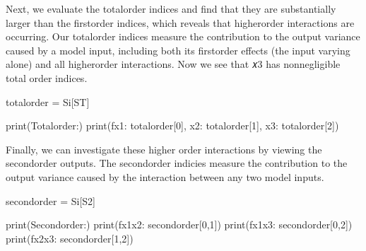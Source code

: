 \documentclass[letterpaper,10pt,english]{book}
\begin{document}
\begin{sphinxVerbatim}[commandchars=\\\{\}]
     
\end{sphinxVerbatim}

\sphinxAtStartPar
Next, we evaluate the total\sphinxhyphen{}order indices and find that they are
substantially larger than the first\sphinxhyphen{}order indices, which reveals that
higher\sphinxhyphen{}order interactions are occurring. Our total\sphinxhyphen{}order indices measure
the contribution to the output variance caused by a model input,
including both its first\sphinxhyphen{}order effects (the input varying alone) and all
higher\sphinxhyphen{}order interactions. Now we see that 𝑥3 has non\sphinxhyphen{}negligible total
order indices.

\begin{sphinxVerbatim}[commandchars=\\\{\}]
total\PYGZus{}order = Si[\PYGZsq{}ST\PYGZsq{}]

print(\PYGZsq{}Total\PYGZhy{}order:\PYGZsq{})
print(f\PYGZdq{}x1: \PYGZob{}total\PYGZus{}order[0]\PYGZcb{}, x2: \PYGZob{}total\PYGZus{}order[1]\PYGZcb{}, x3: \PYGZob{}total\PYGZus{}order[2]\PYGZcb{}\PYGZdq{})
\end{sphinxVerbatim}

\begin{sphinxVerbatim}[commandchars=\\\{\}]
     
\end{sphinxVerbatim}

\sphinxAtStartPar
Finally, we can investigate these higher order interactions by viewing
the second\sphinxhyphen{}order outputs. The second\sphinxhyphen{}order indicies measure the
contribution to the output variance caused by the interaction between
any two model inputs.

\begin{sphinxVerbatim}[commandchars=\\\{\}]
second\PYGZus{}order = Si[\PYGZsq{}S2\PYGZsq{}]

print(\PYGZdq{}Second\PYGZhy{}order:\PYGZdq{})
print(f\PYGZdq{}x1\PYGZhy{}x2:  \PYGZob{}second\PYGZus{}order[0,1]\PYGZcb{}\PYGZdq{})
print(f\PYGZdq{}x1\PYGZhy{}x3:  \PYGZob{}second\PYGZus{}order[0,2]\PYGZcb{}\PYGZdq{})
print(f\PYGZdq{}x2\PYGZhy{}x3:  \PYGZob{}second\PYGZus{}order[1,2]\PYGZcb{}\PYGZdq{})
\end{sphinxVerbatim}
\end{document}
